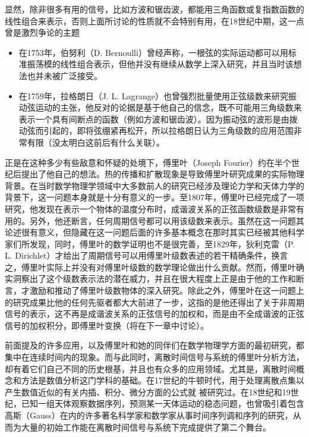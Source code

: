 显然，除非很多有用的信号，比如方波和锯齿波，都能用三角函数或复指数函数的线性组合来表示，否则上面所讨论的性质就不会特别有用，在18世纪中期，这一点曾是激烈争论的主题
\begin{itemize}
    \item 在1753年，伯努利（D. Bernoulli）曾经声称，一根弦的实际运动都可以用标准振荡模的线性组合表示，但他并没有继续从数学上深入研究，并且当时该想法也并未被广泛接受。
    \item 在1759年，拉格朗日（J. L. Lagrange）也曾强烈批量使用正弦级数来研究振动弦运动的主张，他反对的论据是基于他自己的信念，既不可能用三角级数来表示一个具有间断点的函数（例如方波和锯齿波）。因为振动弦的波形是由拨动弦而引起的，即将弦绷紧再松开，所以拉格朗日认为三角级数的应用范围非常有限（没太明白这前后有什么关联）。
\end{itemize}
正是在这种多少有些敌意和怀疑的处境下，傅里叶（Joseph Fourier）约在半个世纪后提出了他自己的想法。热的传播和扩散现象是导致傅里叶研究成果的实际物理背景。在当时数学物理学领域中大多数前人的研究已经涉及理论力学和天体力学的背景下，这一问题本身就是十分有意义的一步。至1807年，傅里叶已经完成了一项研究，他发现在表示一个物体的温度分布时，成谐波关系的正弦函数级数是非常有用的。另外，他还断言，任何周期信号都可以用该级数来表示。虽然在这一问题其论述很有意义，但隐藏在这一问题后面的许多基本概念在那时其实已经被其他科学家们所发现，同时，傅里叶的数学证明也不是很完善，至1829年，狄利克雷（P. L. Dirichlet）才给出了周期信号可以用傅里叶级数表述的若干精确条件，换言之，傅里叶实际上并没有对傅里叶级数的数学理论做出什么贡献。然而，傅里叶确实洞察出了这个级数表示法的潜在威力，并且在很大程度上正是由于他的工作和断言，才激励和推动了傅里叶级数物体的深入研究。除此之外，傅里叶在这一问题上的研究成果比他的任何先驱者都大大前进了一步，这指的是他还得出了关于非周期信号的表示，这不再是成谐波关系的正弦信号的加权和，而是由不全成谐波的正弦信号的加权积分，即傅里叶变换（将在下一章中讨论）。

前面提及的许多应用，以及傅里叶和她的同伴们在数学物理学方面的最初研究，都集中在连续时间内的现象。而与此同时，离散时间信号与系统的傅里叶分析方法，却有着它们自己不同的历史根基，并且也有众多的应用领域。尤其是，离散时间概念和方法是数值分析这门学科的基础。在17世纪的牛顿时代，用于处理离散点集以产生数值近似的有关内插、积分、微分方面的公式就  被研究过。在18世纪和19世纪，已知一组天体观察数据序列，预测某一天体运动的稳态问题，也曾吸引着包含高斯（Gauss）在内的许多著名科学家和数学家从事时间序列调和序列的研究，从而为大量的初始工作能在离散时间信号与系统下完成提供了第二个舞台。